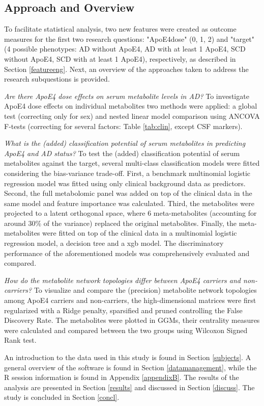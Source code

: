 \documentclass{amsart}
\begin{document}
\subsection{Approach and Overview}
To facilitate statistical analysis, two new features were created as outcome measures for the first two research questions: "ApoE4dose" (0, 1, 2) and "target" (4 possible phenotypes: AD without ApoE4, AD with at least 1 ApoE4, SCD without ApoE4, SCD with at least 1 ApoE4), respectively, as described in Section \ref{featureeng}. Next, an overview of the approaches taken to address the research subquestions is provided.

\textit{Are there ApoE4 dose effects on serum metabolite levels in AD?} 
To investigate ApoE4 dose effects on individual metabolites two methods were applied: a global test (correcting only for sex) and nested linear model comparison using ANCOVA F-tests (correcting for several factors: Table \ref{tab:clin}, except CSF markers). 

\textit{What is the (added) classification potential of serum metabolites in predicting ApoE4 and AD status?}
To test the (added) classification potential of serum metabolites against the target, several multi-class classification models were fitted considering the bias-variance trade-off. First, a benchmark multinomial logistic regression model was fitted using only clinical background data as predictors. Second, the full metabolomic panel was added on top of the clinical data in the same model and feature importance was calculated. Third, the metabolites were projected to a latent orthogonal space, where 6 meta-metabolites (accounting for around 30\% of the variance) replaced the original metabolites. Finally, the meta-metabolites were fitted on top of the clinical data in a multinomial logistic regression model, a decision tree and a \acrfull{xgb} model. The discriminatory performance of the aforementioned models was comprehensively evaluated and compared.

\textit{How do the metabolite network topologies differ between ApoE4 carriers and non-carriers?}
To visualize and compare the (precision) metabolite network topologies among ApoE4 carriers and non-carriers, the high-dimensional matrices were first regularized with a Ridge penalty, sparsified and pruned controlling the False Discovery Rate. The metabolites were plotted in GGMs, their centrality measures were calculated and compared between the two groups using Wilcoxon Signed Rank test.

An introduction to the data used in this study is found in Section \ref{subjects}. A general overview of the software is found in Section \ref{datamanagement}, while the R session information is found in Appendix \ref{appendixB}. The results of the analysis are presented in Section \ref{results} and discussed in Section \ref{discuss}. The study is concluded in Section \ref{concl}.
\end{document}
